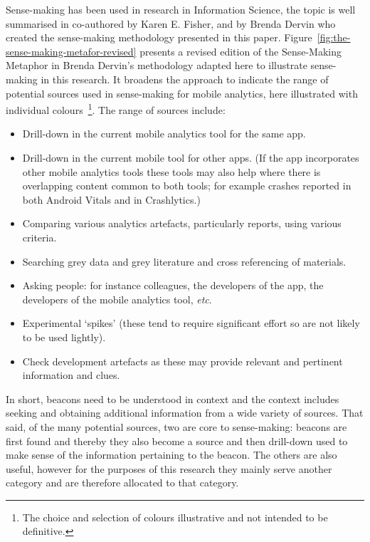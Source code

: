 Sense-making has been used in research in Information Science, the topic is well summarised in \citealt{naumer2008_sense_making} co-authored by Karen E. Fisher, and by Brenda Dervin who created the sense-making methodology presented in this paper. Figure~\ref{fig:the-sense-making-metafor-revised} presents a revised edition of the Sense-Making Metaphor in Brenda Dervin's methodology adapted here to illustrate sense-making in this research. It broadens the approach to indicate the range of potential sources used in sense-making for mobile analytics, here illustrated with individual colours~\footnote{The choice and selection of colours illustrative and not intended to be definitive.}. The range of sources include:

\begin{itemize}
\itemsep0em
    \item Drill-down in the current mobile analytics tool for the same app.
    \item Drill-down in the current mobile tool for other apps. (If the app incorporates other mobile analytics tools these tools may also help where there is overlapping content common to both tools; for example crashes reported in both Android Vitals and in Crashlytics.)
    \item Comparing various analytics artefacts, particularly reports, using various criteria.
    \item Searching grey data and grey literature and cross referencing of materials.
    \item Asking people: for instance colleagues, the developers of the app, the developers of the mobile analytics tool, \textit{etc}.
    \item Experimental `spikes' (these tend to require significant effort so are not likely to be used lightly).
    \item Check development artefacts as these may provide relevant and pertinent information and clues.
\end{itemize}

In short, beacons need to be understood in context and the context includes seeking and obtaining additional information from a wide variety of sources. That said, of the many potential sources, two are core to sense-making: beacons are first found and thereby they also become a source and then drill-down used to make sense of the information pertaining to the beacon. The others are also useful, however for the purposes of this research they mainly serve another category and are therefore allocated to that category.

